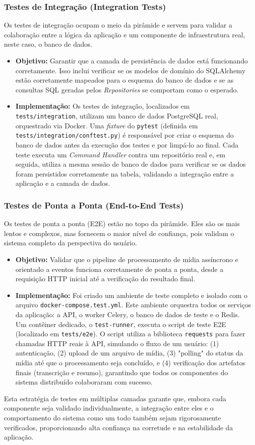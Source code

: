 \subsubsection{Testes de Integração (Integration Tests)}
Os testes de integração ocupam o meio da pirâmide e servem para validar a colaboração entre a lógica da aplicação e um componente de infraestrutura real, neste caso, o banco de dados.
\begin{itemize}
    \item \textbf{Objetivo:} Garantir que a camada de persistência de dados está funcionando corretamente. Isso inclui verificar se os modelos de domínio do SQLAlchemy estão corretamente mapeados para o esquema do banco de dados e se as consultas SQL geradas pelos \textit{Repositories} se comportam como o esperado.
    \item \textbf{Implementação:} Os testes de integração, localizados em \texttt{tests/integration}, utilizam um banco de dados PostgreSQL real, orquestrado via Docker. Uma \textit{fixture} do \texttt{pytest} (definida em \texttt{tests/integration/conftest.py}) é responsável por criar o esquema do banco de dados antes da execução dos testes e por limpá-lo ao final. Cada teste executa um \textit{Command Handler} contra um repositório real e, em seguida, utiliza a mesma sessão de banco de dados para verificar se os dados foram persistidos corretamente na tabela, validando a integração entre a aplicação e a camada de dados.
\end{itemize}

\subsubsection{Testes de Ponta a Ponta (End-to-End Tests)}
Os testes de ponta a ponta (E2E) estão no topo da pirâmide. Eles são os mais lentos e complexos, mas fornecem o maior nível de confiança, pois validam o sistema completo da perspectiva do usuário.
\begin{itemize}
    \item \textbf{Objetivo:} Validar que o pipeline de processamento de mídia assíncrono e orientado a eventos funciona corretamente de ponta a ponta, desde a requisição HTTP inicial até a verificação do resultado final.
    \item \textbf{Implementação:} Foi criado um ambiente de teste completo e isolado com o arquivo \texttt{docker-compose.test.yml}. Este ambiente orquestra todos os serviços da aplicação: a API, o worker Celery, o banco de dados de teste e o Redis. Um contêiner dedicado, o \texttt{test-runner}, executa o script de teste E2E (localizado em \texttt{tests/e2e}). O script utiliza a biblioteca \texttt{requests} para fazer chamadas HTTP reais à API, simulando o fluxo de um usuário: (1) autenticação, (2) upload de um arquivo de mídia, (3) "polling" do status da mídia até que o processamento seja concluído, e (4) verificação dos artefatos finais (transcrição e resumo), garantindo que todos os componentes do sistema distribuído colaboraram com sucesso.
\end{itemize}

Esta estratégia de testes em múltiplas camadas garante que, embora cada componente seja validado individualmente, a integração entre eles e o comportamento do sistema como um todo também sejam rigorosamente verificados, proporcionando alta confiança na corretude e na estabilidade da aplicação.
